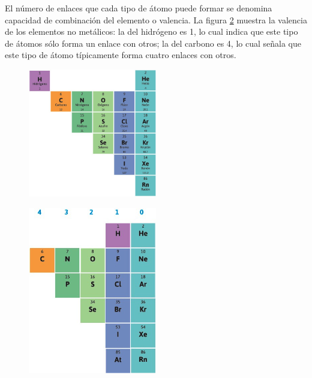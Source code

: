\documentclass[11pt]{book}
\begin{document}
El número de enlaces que cada tipo de átomo puede
formar se denomina capacidad de combinación del elemento o valencia. La figura \ref{fig:valencia}
muestra la valencia de los elementos no metálicos: la del hidrógeno es 1, lo cual
indica que este tipo de átomos sólo forma un enlace con otros; la del carbono es 4,
lo cual señala que este tipo de átomo típicamente forma cuatro enlaces con otros.

\begin{minipage}{.4\textwidth}
  \begin{figure}[H]
    \centering
    \includegraphics[width=0.5\textwidth]{no_metales.jpg}
    \label{fig:no_metales}
  \end{figure}
\end{minipage}\hfill
\begin{minipage}{.4\textwidth}
  \begin{figure}[H]
    \centering
    \includegraphics[width=0.5\textwidth]{valencia.jpg}
    \label{fig:valencia}
  \end{figure}
\end{minipage}
\end{document}
